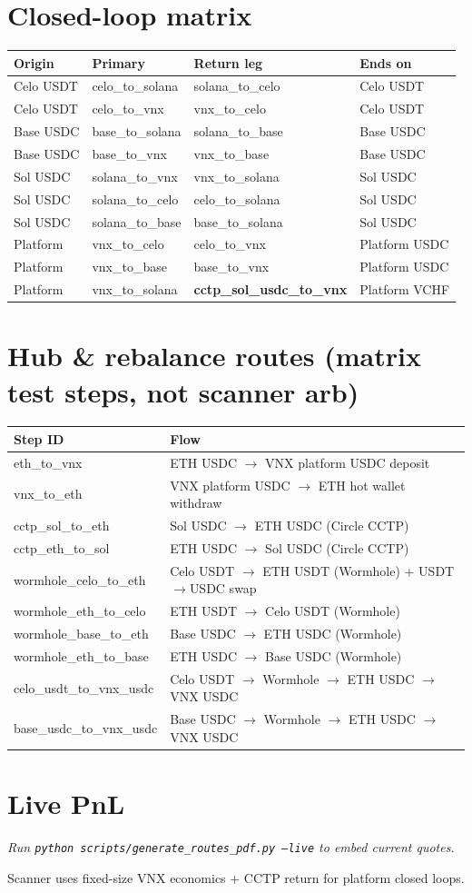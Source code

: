 \documentclass[11pt,a4paper]{article}
\begin{document}
\section*{Closed-loop matrix}
\small
\begin{longtable}{@{}llll@{}}
\toprule
Origin & Primary & Return leg & Ends on \\
\midrule
\endhead
Celo USDT & celo\_to\_solana & solana\_to\_celo & Celo USDT \\
Celo USDT & celo\_to\_vnx & vnx\_to\_celo & Celo USDT \\
Base USDC & base\_to\_solana & solana\_to\_base & Base USDC \\
Base USDC & base\_to\_vnx & vnx\_to\_base & Base USDC \\
Sol USDC & solana\_to\_vnx & vnx\_to\_solana & Sol USDC \\
Sol USDC & solana\_to\_celo & celo\_to\_solana & Sol USDC \\
Sol USDC & solana\_to\_base & base\_to\_solana & Sol USDC \\
Platform & vnx\_to\_celo & celo\_to\_vnx & Platform USDC \\
Platform & vnx\_to\_base & base\_to\_vnx & Platform USDC \\
Platform & vnx\_to\_solana & \textbf{cctp\_sol\_usdc\_to\_vnx} & Platform VCHF \\
\bottomrule
\end{longtable}
\normalsize
\section*{Hub \& rebalance routes (matrix test steps, not scanner arb)}
\begin{tabular}{@{}ll@{}}
\toprule
Step ID & Flow \\
\midrule
eth\_to\_vnx & ETH USDC $\rightarrow$ VNX platform USDC deposit \\
vnx\_to\_eth & VNX platform USDC $\rightarrow$ ETH hot wallet withdraw \\
cctp\_sol\_to\_eth & Sol USDC $\rightarrow$ ETH USDC (Circle CCTP) \\
cctp\_eth\_to\_sol & ETH USDC $\rightarrow$ Sol USDC (Circle CCTP) \\
wormhole\_celo\_to\_eth & Celo USDT $\rightarrow$ ETH USDT (Wormhole) + USDT$\rightarrow$USDC swap \\
wormhole\_eth\_to\_celo & ETH USDT $\rightarrow$ Celo USDT (Wormhole) \\
wormhole\_base\_to\_eth & Base USDC $\rightarrow$ ETH USDC (Wormhole) \\
wormhole\_eth\_to\_base & ETH USDC $\rightarrow$ Base USDC (Wormhole) \\
celo\_usdt\_to\_vnx\_usdc & Celo USDT $\rightarrow$ Wormhole $\rightarrow$ ETH USDC $\rightarrow$ VNX USDC \\
base\_usdc\_to\_vnx\_usdc & Base USDC $\rightarrow$ Wormhole $\rightarrow$ ETH USDC $\rightarrow$ VNX USDC \\
\bottomrule
\end{tabular}
\section*{Live PnL}
\textit{Run \texttt{python scripts/generate\_routes\_pdf.py --live} to embed current quotes.}
\vfill
\begin{center}
\color{muted}\small Scanner uses fixed-size VNX economics + CCTP return for platform closed loops.
\end{center}
\end{document}
